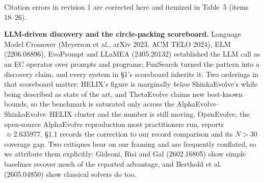 \documentclass[11pt]{article}
\begin{document}
Citation errors in revision 1 are corrected here and itemized in Table~5 (items 18--26).

\textbf{LLM-driven discovery and the circle-packing scoreboard.} Language Model Crossover (Meyerson
et al., arXiv 2023, ACM TELO 2024), ELM (2206.08896), EvoPrompt and LLaMEA (2405.20132)
established the LLM call as an EC operator over prompts and programs; FunSearch turned the
pattern into a discovery claim, and every system in \S1's scoreboard inherits it. Two orderings
in that scoreboard matter: HELIX's figure is marginally \textit{below} ShinkaEvolve's while being
described as state of the art, and ThetaEvolve claims new best-known bounds, so the benchmark is
saturated only across the AlphaEvolve--ShinkaEvolve--HELIX cluster and the number is still moving.
OpenEvolve, the open-source AlphaEvolve reproduction most practitioners run, reports ${\approx}2.635977$.
\S1.1 records the correction to our record comparison and its $N > 30$ coverage gap. Two critiques
bear on our framing and are frequently conflated, so we attribute them explicitly: Gideoni, Risi
and Gal (2602.16805) show simple baselines recover much of the reported advantage, and Berthold
et al. (2605.04850) show classical solvers do too.
\end{document}
